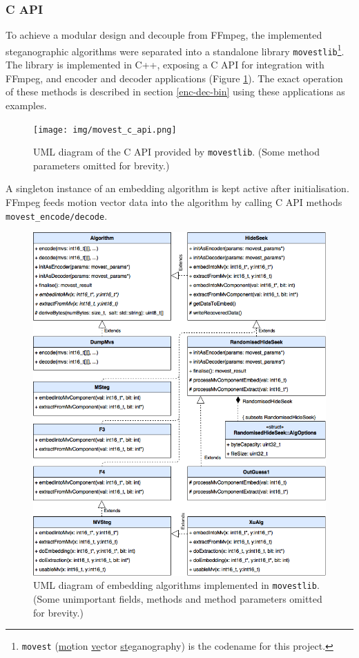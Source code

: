 \documentclass[12pt,british,twoside,notitlepage,usenames,dvipsnames,hypens,final]{report}
\numberwithin{equation}{section}
\numberwithin{figure}{section}
\begin{document}
\subsubsection{C API}

To achieve a modular design and decouple from FFmpeg, the implemented steganographic algorithms were separated into a standalone library \texttt{movestlib}\footnote{\texttt{movest} (\underline{mo}tion \underline{ve}ctor \underline {st}eganography) is the codename for this project.}. The library is implemented in C++, exposing a C API for integration with FFmpeg, and encoder and decoder applications (Figure \ref{fig:movest-c-api}). The exact operation of these methods is described in section \ref{enc-dec-bin} using these applications as examples.

\begin{figure}[tbh]
\centering
\texttt{[image: img/movest\_c\_api.png]}
\caption{UML diagram of the C API provided by \texttt{movestlib}. (Some method parameters omitted for brevity.)}
\label{fig:movest-c-api}
\end{figure}

A singleton instance of an embedding algorithm is kept active after initialisation. FFmpeg feeds motion vector data into the algorithm by calling C API methods \texttt{movest\_encode/decode}.  

\begin{figure}[!htbp]
\centering
\includegraphics[width=\textwidth]{img/movest_alg_class_diag.png}
\caption{UML diagram of embedding algorithms implemented in \texttt{movestlib}. (Some unimportant fields, methods and method parameters omitted for brevity.)}
\label{fig:movest_alg_class_diag}
\end{figure}
\end{document}
